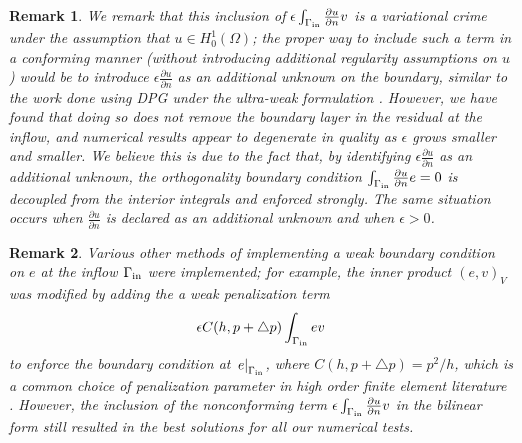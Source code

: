 \documentclass[final,leqno]{siamltex}
\newcommand{\LRp}[1]{\left( #1 \right)}
\newcommand{\pd}[2]{\frac{\partial#1}{\partial#2}}
\newtheorem{remark}{Remark}
\begin{document}
\begin{remark}
We remark that this inclusion of $\epsilon\int_{\Gamma_{\rm in}} \pd{u}{n}v$ is a variational crime under the assumption that $u \in H^1_0(\Omega)$; the proper way to include such a term in a conforming manner (without introducing additional regularity assumptions on $u$) would be to introduce $\epsilon \pd{u}{n}$ as an additional unknown on the boundary, similar to the work done using DPG under the ultra-weak formulation \cite{DPG2,analysisDPG}.  However, we have found that doing so does not remove the boundary layer in the residual at the inflow, and numerical results appear to degenerate in quality as $\epsilon$ grows smaller and smaller.  We believe this is due to the fact that, by identifying $\epsilon \pd{u}{n}$ as an additional unknown, the orthogonality boundary condition $\int_{\Gamma_{\rm in}} \pd{u}{n} e = 0$ is decoupled from the interior integrals and enforced strongly.  The same situation occurs when $\pd{u}{n}$ is declared as an additional unknown and when $\epsilon > 0$.  %

\end{remark}
\begin{remark}
Various other methods of implementing a weak boundary condition on $e$ at the inflow $\Gamma_{\rm in}$ were implemented; for example, the inner product $\LRp{e,v}_V$ was modified by adding the a weak penalization term $$\epsilon C(h,p+\triangle p)\int_{\Gamma_{\rm in}}ev $$ to enforce the boundary condition at $\left.e\right |_{\Gamma_{\rm in}}$, where $C(h,p+\triangle p) = p^2/h$, which is a common choice of penalization parameter in high order finite element literature \cite{nurbsTrace,Warburton20032765}. However, the inclusion of the nonconforming term $\epsilon\int_{\Gamma_{\rm in}} \pd{u}{n}v$ in the bilinear form still resulted in the best solutions for all our numerical tests.  
\end{remark}
\end{document}
